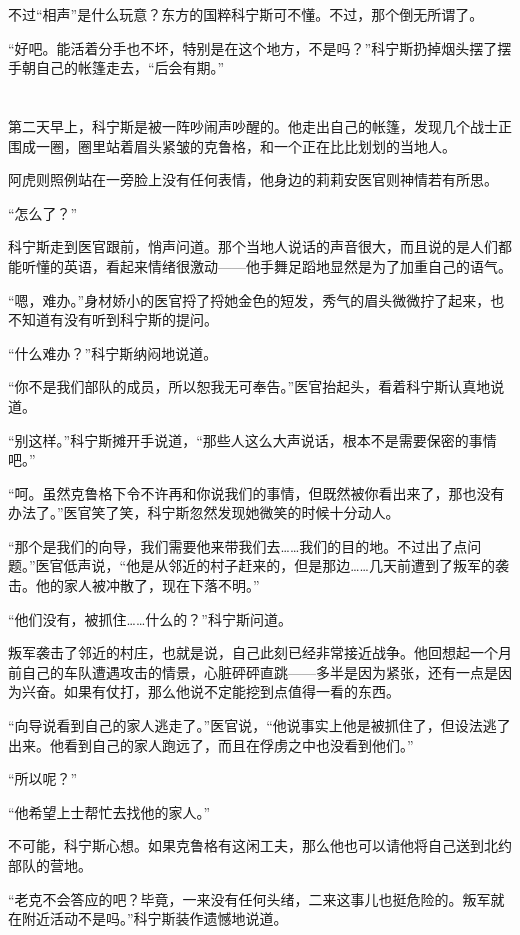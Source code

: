 不过“相声”是什么玩意？东方的国粹科宁斯可不懂。不过，那个倒无所谓了。

“好吧。能活着分手也不坏，特别是在这个地方，不是吗？”科宁斯扔掉烟头摆了摆手朝自己的帐篷走去，“后会有期。”

\section*{}

第二天早上，科宁斯是被一阵吵闹声吵醒的。他走出自己的帐篷，发现几个战士正围成一圈，圈里站着眉头紧皱的克鲁格，和一个正在比比划划的当地人。

阿虎则照例站在一旁脸上没有任何表情，他身边的莉莉安医官则神情若有所思。

“怎么了？”

科宁斯走到医官跟前，悄声问道。那个当地人说话的声音很大，而且说的是人们都能听懂的英语，看起来情绪很激动——他手舞足蹈地显然是为了加重自己的语气。

“嗯，难办。”身材娇小的医官捋了捋她金色的短发，秀气的眉头微微拧了起来，也不知道有没有听到科宁斯的提问。

“什么难办？”科宁斯纳闷地说道。

“你不是我们部队的成员，所以恕我无可奉告。”医官抬起头，看着科宁斯认真地说道。

“别这样。”科宁斯摊开手说道，“那些人这么大声说话，根本不是需要保密的事情吧。”

“呵。虽然克鲁格下令不许再和你说我们的事情，但既然被你看出来了，那也没有办法了。”医官笑了笑，科宁斯忽然发现她微笑的时候十分动人。

“那个是我们的向导，我们需要他来带我们去……我们的目的地。不过出了点问题。”医官低声说，“他是从邻近的村子赶来的，但是那边……几天前遭到了叛军的袭击。他的家人被冲散了，现在下落不明。”

“他们没有，被抓住……什么的？”科宁斯问道。

叛军袭击了邻近的村庄，也就是说，自己此刻已经非常接近战争。他回想起一个月前自己的车队遭遇攻击的情景，心脏砰砰直跳——多半是因为紧张，还有一点是因为兴奋。如果有仗打，那么他说不定能挖到点值得一看的东西。

“向导说看到自己的家人逃走了。”医官说，“他说事实上他是被抓住了，但设法逃了出来。他看到自己的家人跑远了，而且在俘虏之中也没看到他们。”

“所以呢？”

“他希望上士帮忙去找他的家人。”

不可能，科宁斯心想。如果克鲁格有这闲工夫，那么他也可以请他将自己送到北约部队的营地。

“老克不会答应的吧？毕竟，一来没有任何头绪，二来这事儿也挺危险的。叛军就在附近活动不是吗。”科宁斯装作遗憾地说道。

